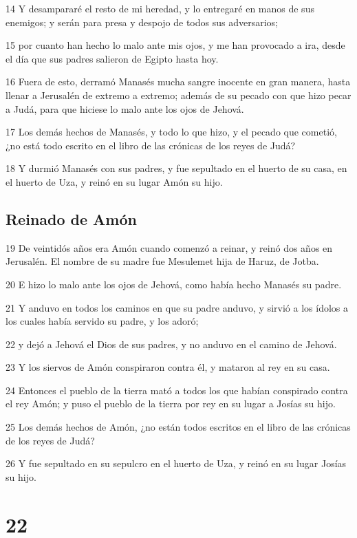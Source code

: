 \par 14 Y desampararé el resto de mi heredad, y lo entregaré en manos de sus enemigos; y serán para presa y despojo de todos sus adversarios;
\par 15 por cuanto han hecho lo malo ante mis ojos, y me han provocado a ira, desde el día que sus padres salieron de Egipto hasta hoy.
\par 16 Fuera de esto, derramó Manasés mucha sangre inocente en gran manera, hasta llenar a Jerusalén de extremo a extremo; además de su pecado con que hizo pecar a Judá, para que hiciese lo malo ante los ojos de Jehová.
\par 17 Los demás hechos de Manasés, y todo lo que hizo, y el pecado que cometió, ¿no está todo escrito en el libro de las crónicas de los reyes de Judá?
\par 18 Y durmió Manasés con sus padres, y fue sepultado en el huerto de su casa, en el huerto de Uza, y reinó en su lugar Amón su hijo.

\section*{Reinado de Amón}

\par 19 De veintidós años era Amón cuando comenzó a reinar, y reinó dos años en Jerusalén. El nombre de su madre fue Mesulemet hija de Haruz, de Jotba.
\par 20 E hizo lo malo ante los ojos de Jehová, como había hecho Manasés su padre.
\par 21 Y anduvo en todos los caminos en que su padre anduvo, y sirvió a los ídolos a los cuales había servido su padre, y los adoró;
\par 22 y dejó a Jehová el Dios de sus padres, y no anduvo en el camino de Jehová.
\par 23 Y los siervos de Amón conspiraron contra él, y mataron al rey en su casa.
\par 24 Entonces el pueblo de la tierra mató a todos los que habían conspirado contra el rey Amón; y puso el pueblo de la tierra por rey en su lugar a Josías su hijo.
\par 25 Los demás hechos de Amón, ¿no están todos escritos en el libro de las crónicas de los reyes de Judá?
\par 26 Y fue sepultado en su sepulcro en el huerto de Uza, y reinó en su lugar Josías su hijo.

\chapter{22}

